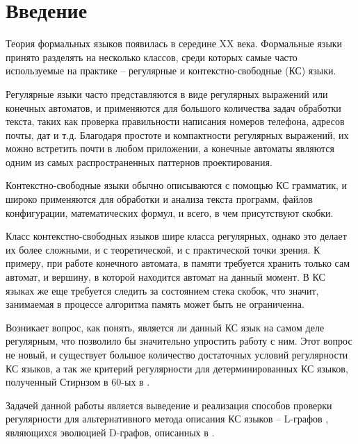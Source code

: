 \chapter{Введение} \label{chapter0}


Теория формальных языков появилась в середине XX века. 
Формальные языки принято разделять на несколько классов, среди которых самые часто используемые на практике -- 
регулярные и контекстно-свободные (КС) языки. 

Регулярные языки часто представляются в виде регулярных выражений или
конечных автоматов, и применяются для большого количества задач обработки текста, 
таких как проверка правильности написания номеров телефона, адресов почты, дат и т.д.
Благодаря простоте и компактности регулярных выражений, их можно встретить почти в любом
приложении, а конечные автоматы являются одним из самых распространенных паттернов проектирования.

Контекстно-свободные языки обычно описываются с помощью КС грамматик,
и широко применяются для обработки и анализа текста программ, файлов конфигурации, математических
формул, и всего, в чем присутствуют скобки.

Класс контекстно-свободных языков шире класса регулярных, однако это делает их более сложными,
и с теоретической, и с практической точки зрения. К примеру, при работе конечного автомата,
в памяти требуется хранить только сам автомат, и вершину, в которой находится автомат на данный 
момент. В КС языках же еще требуется следить за состоянием стека скобок,
что значит, занимаемая в процессе алгоритма память может быть не ограниченна. 

Возникает вопрос, как понять, является ли данный КС язык на самом деле регулярным, что позволило бы
значительно упростить работу с ним. Этот вопрос не новый, и существует большое количество
достаточных условий регулярности КС языков, а так же критерий регулярности для детерминированных КС
языков, полученный Стирнзом в 60-ых в \cite{stearns_reg}.

Задачей данной работы является выведение и реализация способов проверки регулярности для альтернативного 
метода описания КС языков -- L-графов \cite{vylitok_rostovski_o_podklassah,vylitok_sutirin_harakterizacia}, являющихся эволюцией D-графов, описанных в \cite{stan1}.

\clearpage
